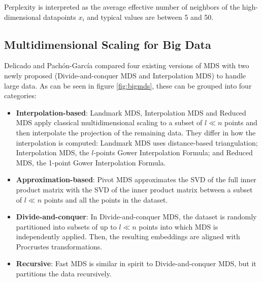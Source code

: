Perplexity is interpreted as the average effective number of neighbors of the high-dimensional datapoints $x_i$ and typical values are between 5 and 50.

\subsection{Multidimensional Scaling for Big Data}

Delicado and Pachón-García \cite{Delicado2024a} compared four existing versions of MDS with two newly proposed (Divide-and-conquer MDS and Interpolation MDS) to handle large data. As can be seen in figure \ref{fig:bigmds}, these can be grouped into four categories:

\begin{itemize}
    \item \textbf{Interpolation-based}: Landmark MDS, Interpolation MDS and Reduced MDS apply classical multidimensional scaling to a subset of $l \ll n$ points and then interpolate the projection of the remaining data. They differ in how the interpolation is computed: Landmark MDS uses distance-based triangulation; Interpolation MDS, the $l$-points Gower Interpolation Formula; and Reduced MDS, the 1-point Gower Interpolation Formula.
    \item \textbf{Approximation-based}: Pivot MDS approximates the SVD of the full inner product matrix with the SVD of the inner product matrix between a subset of $l \ll n$ points and all the points in the dataset.
    \item \textbf{Divide-and-conquer}: In Divide-and-conquer MDS, the dataset is randomly partitioned into subsets of up to $l \ll n$ points into which MDS is independently applied. Then, the resulting embeddings are aligned with Procrustes transformations.
    \item \textbf{Recursive}: Fast MDS is similar in spirit to Divide-and-conquer MDS, but it partitions the data recursively. 
\end{itemize}

